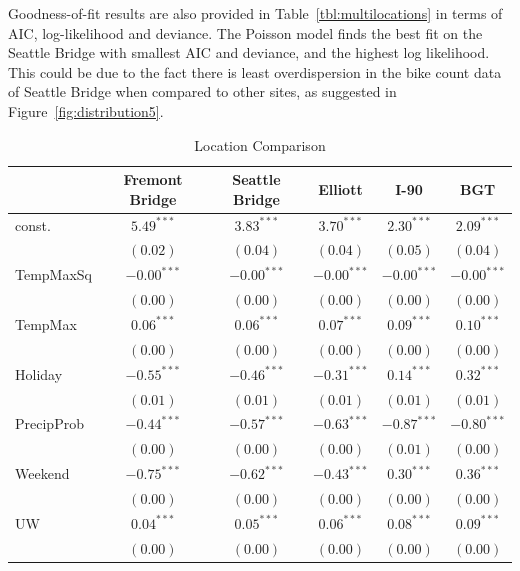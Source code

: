 \documentclass [11pt, proquest] {uwthesis}[2015/03/03]
\begin{document}
Goodness-of-fit results are also provided in Table~\ref{tbl:multilocations} in terms of AIC, log-likelihood and deviance. The Poisson model finds the best fit on the Seattle Bridge with smallest AIC and deviance, and the highest log likelihood. This could be due to the fact there is least overdispersion in the bike count data of Seattle Bridge when compared to other sites, as suggested in Figure~\ref{fig:distribution5}. 


\begin{table}
\caption{Location Comparison}
\begin{center}
\begin{tabular}{l c c c c c }
\hline
 & Fremont Bridge & Seattle Bridge & Elliott & I-90 & BGT \\
\hline
const.         & $5.49^{***}$  & $3.83^{***}$  & $3.70^{***}$  & $2.30^{***}$  & $2.09^{***}$  \\
               & $(0.02)$      & $(0.04)$      & $(0.04)$      & $(0.05)$      & $(0.04)$      \\
TempMaxSq      & $-0.00^{***}$ & $-0.00^{***}$ & $-0.00^{***}$ & $-0.00^{***}$ & $-0.00^{***}$ \\
               & $(0.00)$      & $(0.00)$      & $(0.00)$      & $(0.00)$      & $(0.00)$      \\
TempMax        & $0.06^{***}$  & $0.06^{***}$  & $0.07^{***}$  & $0.09^{***}$  & $0.10^{***}$  \\
               & $(0.00)$      & $(0.00)$      & $(0.00)$      & $(0.00)$      & $(0.00)$      \\
Holiday        & $-0.55^{***}$ & $-0.46^{***}$ & $-0.31^{***}$ & $0.14^{***}$  & $0.32^{***}$  \\
               & $(0.01)$      & $(0.01)$      & $(0.01)$      & $(0.01)$      & $(0.01)$      \\
PrecipProb     & $-0.44^{***}$ & $-0.57^{***}$ & $-0.63^{***}$ & $-0.87^{***}$ & $-0.80^{***}$ \\
               & $(0.00)$      & $(0.00)$      & $(0.00)$      & $(0.01)$      & $(0.00)$      \\
Weekend        & $-0.75^{***}$ & $-0.62^{***}$ & $-0.43^{***}$ & $0.30^{***}$  & $0.36^{***}$  \\
               & $(0.00)$      & $(0.00)$      & $(0.00)$      & $(0.00)$      & $(0.00)$      \\
UW             & $0.04^{***}$  & $0.05^{***}$  & $0.06^{***}$  & $0.08^{***}$  & $0.09^{***}$  \\
               & $(0.00)$      & $(0.00)$      & $(0.00)$      & $(0.00)$      & $(0.00)$      \\

\end{tabular}
\end{center}
\end{table}
\end{document}
